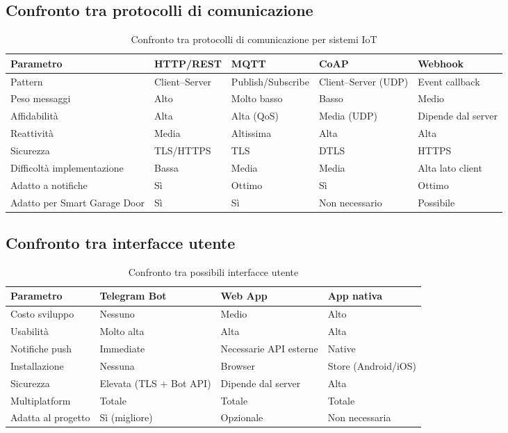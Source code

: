  \subsection{Confronto tra protocolli di comunicazione}
 
 \begin{table}[H] \centering \caption{Confronto tra protocolli di comunicazione per sistemi IoT} \label{tab:protocols} \begin{tabularx}{\textwidth}{@{}lXXXX@{}} \toprule \textbf{Parametro} & \textbf{HTTP/REST} & \textbf{MQTT} & \textbf{CoAP} & \textbf{Webhook} \\ \midrule Pattern & Client--Server & Publish/\newline Subscribe & Client--Server (UDP) & Event callback \\ Peso messaggi & Alto & Molto basso & Basso & Medio \\ Affidabilità & Alta & Alta (QoS) & Media (UDP) & Dipende dal server \\ Reattività & Media & Altissima & Alta & Alta \\ Sicurezza & TLS/HTTPS & TLS & DTLS & HTTPS \\ Difficoltà implementazione & Bassa & Media & Media & Alta lato client \\ Adatto a notifiche & Sì & Ottimo & Sì & Ottimo \\ Adatto per Smart Garage Door & Sì & Sì & Non necessario & Possibile \\ \bottomrule \end{tabularx} \end{table} 
 
 
 
 \subsection{Confronto tra interfacce utente} \begin{table}[H] \centering \caption{Confronto tra possibili interfacce utente} \label{tab:ui} \begin{tabularx}{\textwidth}{@{}lXXX@{}} \toprule \textbf{Parametro} & \textbf{Telegram Bot} & \textbf{Web App} & \textbf{App nativa} \\ \midrule Costo sviluppo & Nessuno & Medio & Alto \\ Usabilità & Molto alta & Alta & Alta \\ Notifiche push & Immediate & Necessarie API esterne & Native \\ Installazione & Nessuna & Browser & Store (Android/iOS) \\ Sicurezza & Elevata (TLS + Bot API) & Dipende dal server & Alta \\ Multiplatform & Totale & Totale & Totale \\ Adatta al progetto & Sì (migliore) & Opzionale & Non necessaria \\ \bottomrule \end{tabularx} \end{table} 
 
